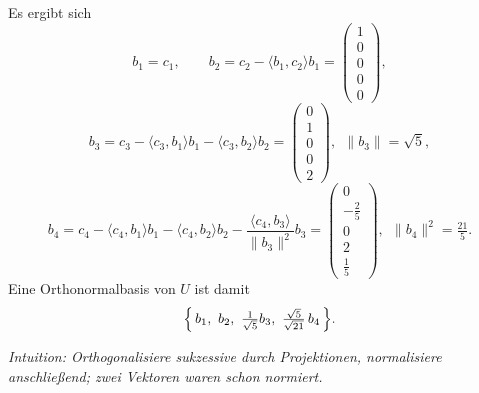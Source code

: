 \documentclass[11pt, a4paper]{article}
\begin{document}
\begin{enumerate}
\begin{framed}
\[  \]
  Es ergibt sich
  \[
  b_1=c_1,\qquad
  b_2=c_2-\langle b_1,c_2\rangle b_1=\begin{pmatrix}1\\0\\0\\0\\0\end{pmatrix},
  \]
  \[
  b_3=c_3-\langle c_3,b_1\rangle b_1-\langle c_3,b_2\rangle b_2
      =\begin{pmatrix}0\\1\\0\\0\\2\end{pmatrix},\ \ \|b_3\|=\sqrt5,
  \]
  \[
  b_4=c_4-\langle c_4,b_1\rangle b_1-\langle c_4,b_2\rangle b_2
      -\frac{\langle c_4,b_3\rangle}{\|b_3\|^2}b_3
      =\begin{pmatrix}0\\-\tfrac{2}{5}\\0\\2\\\tfrac{1}{5}\end{pmatrix},
      \ \ \|b_4\|^2=\tfrac{21}{5}.
  \]
  Eine Orthonormalbasis von $U$ ist damit
  \[
  \Bigl\{\,b_1,\ b_2,\ \tfrac{1}{\sqrt5}b_3,\ \tfrac{\sqrt5}{\sqrt{21}}\,b_4\,\Bigr\}.
  \]

  \medskip\noindent\textit{Intuition: Orthogonalisiere sukzessive durch Projektionen, normalisiere anschließend; zwei Vektoren waren schon normiert.}
  \end{framed}


\end{enumerate}
\end{document}
